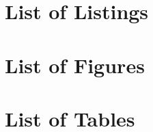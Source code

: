 \chapter{List of Listings}
\lstlistoflistings

\chapter{List of Figures}
\listoffigures

\chapter{List of Tables}
\renewcommand{\listtablename}{}
\listoftables



